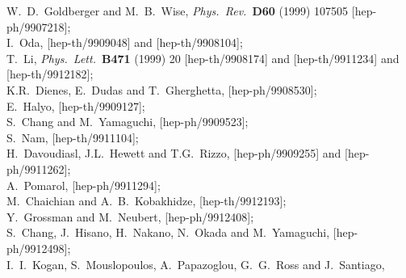 \documentclass[a4paper,12pt]{article}
\begin{document}
\begin{thebibliography}{99}
W.~D.~Goldberger and M.~B.~Wise,
{\it Phys.\ Rev.}\  {\bf D60} (1999) 107505
[hep-ph/9907218];\\
%
I.~Oda,
[hep-th/9909048]
and
[hep-th/9908104];\\
%
T.~Li,
{\it Phys.\ Lett.}\  {\bf B471} (1999) 20
[hep-th/9908174]
and
[hep-th/9911234]
and
[hep-th/9912182];\\
%
K.R.~Dienes, E.~Dudas and T.~Gherghetta,
[hep-ph/9908530];\\
%
E.~Halyo,
[hep-th/9909127];\\
%
S.~Chang and M.~Yamaguchi,
[hep-ph/9909523];\\
%
S.~Nam,
[hep-th/9911104];\\
%
H.~Davoudiasl, J.L.~Hewett and T.G.~Rizzo,
[hep-ph/9909255]
and
[hep-ph/9911262];\\
%
A.~Pomarol,
[hep-ph/9911294];\\
%
M.~Chaichian and A.~B.~Kobakhidze,
[hep-th/9912193];\\
%
Y.~Grossman and M.~Neubert,
[hep-ph/9912408];\\
%
S.~Chang, J.~Hisano, H.~Nakano, N.~Okada and M.~Yamaguchi,
[hep-ph/9912498];\\
%
I.~I.~Kogan, S.~Mouslopoulos, A.~Papazoglou, G.~G.~Ross and J.~Santiago,

\end{thebibliography}
\end{document}
